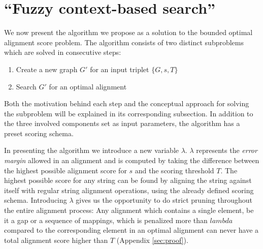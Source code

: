 \documentclass[thesis.tex]{subfiles}
\begin{document}
\clearpage
\section{``Fuzzy context-based search''}
We now present the algorithm we propose as a solution to the bounded optimal alignment score problem. The algorithm consists of two distinct subproblems which are solved in consecutive steps:
\begin{enumerate}
  \item Create a new graph $G'$ for an input triplet $\{G, s, T\}$
  \item Search $G'$ for an optimal alignment
\end{enumerate}
Both the motivation behind each step and the conceptual approach for solving the subproblem will be explained in its corresponding subsection. In addition to the three involved components set as input parameters, the algorithm has a preset scoring schema.\\
\par\noindent
In presenting the algorithm we introduce a new variable $\lambda$. $\lambda$ represents the \textit{error margin} allowed in an alignment and is computed by taking the difference between the highest possible alignment score for $s$ and the scoring threshold $T$. The highest possible score for any string can be found by aligning the string against itself with regular string alignment operations, using the already defined scoring schema. Introducing $\lambda$ gives us the opportunity to do strict pruning throughout the entire alignment process: Any alignment which contains a single element, be it a gap or a sequence of mappings, which is penalized more than $lambda$ compared to the corresponding element in an optimal alignment can never have a total alignment score higher than $T$ (Appendix \ref{sec:proof}).
\end{document}

